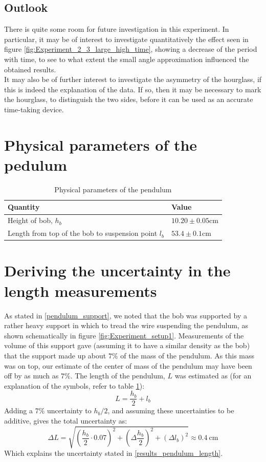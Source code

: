 \documentclass[a4paper, 10pt]{article}
\begin{document}
\subsection{Outlook}
There is quite some room for future investigation in this experiment. In particular, it may be of interest to investigate quantitatively the effect seen in figure \ref{fig:Experiment_2_3_large_high_time}, showing a decrease of the period with time, to see to what extent the small angle approximation influenced the obtained results.\\
\linebreak
It may also be of further interest to investigate the asymmetry of the hourglass, if this is indeed the explanation of the data. If so, then it may be necessary to mark the hourglass, to distinguish the two sides, before it can be used as an accurate time-taking device.
{}

\pagebreak
\begin{appendices}
\section{Physical parameters of the pedulum}\label{ap:physical_parameters}
\begin{table}[ht!]
\centering
\caption{Physical parameters of the pendulum}
\label{tab:physical_parameters_of_pendulum}
\begin{tabular}{|l|l|}
\hline
\textbf{Quantity}                              & \textbf{Value}                 \\
\hline
Height of bob, $h_b$                                  & $10.20\pm 0.05  \mathrm{cm}$  \\
Length from top of the bob to suspension point $l_b$ & $53.4 \pm 0.1 \mathrm{cm}$   \\
\hline 
\end{tabular}
\end{table}
\section{Deriving the uncertainty in the length measurements}\label{ap:uncertainty_in_length}
As stated in \ref{pendulum_support}, we noted that the bob was supported by a rather heavy support in which to tread the wire suspending the pendulum, as shown schematically in figure \ref{fig:Experiment_setup1}. Measurements of the volume of this support gave (assuming it to have a similar density as the bob) that the support made up about $7\%$ of the mass of the pendulum. As this mass was on top, our estimate of the center of mass of the pendulum may have been off by as much as $7\%$. The length of the pendulum, $L$ was estimated as (for an explanation of the symbols, refer to table \ref{tab:physical_parameters_of_pendulum}): 
$$L=\frac{h_b}{2}+l_b$$
Adding a $7\%$ uncertainty to $h_b/2$, and assuming these uncertainties to be additive, gives the total uncertainty as:
$$\Delta L = \sqrt{\left(\frac{h_b}{2}\cdot 0.07\right)^2+ \left(\Delta\frac{h_b}{2}\right)^2+(\Delta l_b)^2} \approx 0.4 \ \mathrm{cm} $$
Which explains the uncertainty stated in \ref{results_pendulum_length}.
\end{appendices}
\end{document}
